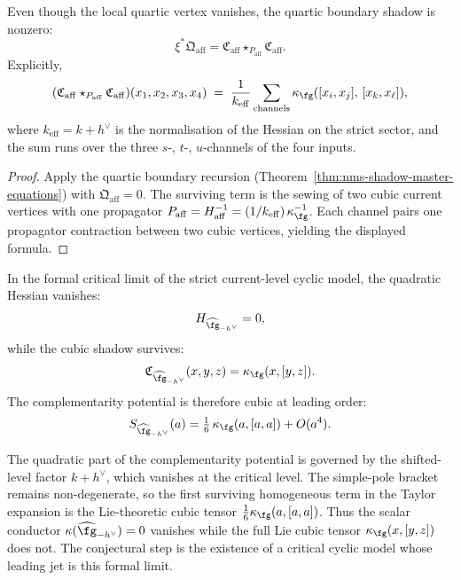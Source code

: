 \begin{corollary}\label{cor:affine-boundary-quartic}
Even though the local quartic vertex vanishes, the quartic
boundary shadow is nonzero:
\[
\xi^*\mathfrak{Q}_{\mathrm{aff}}
= \mathfrak{C}_{\mathrm{aff}} \star_{P_{\mathrm{aff}}}
 \mathfrak{C}_{\mathrm{aff}}.
\]
Explicitly,
\[
(\mathfrak{C}_{\mathrm{aff}} \star_{P_{\mathrm{aff}}}
\mathfrak{C}_{\mathrm{aff}})(x_1,x_2,x_3,x_4)
\;=\;
\frac{1}{k_{\mathrm{eff}}}
\sum_{\mathrm{channels}}
\kappa_{\fg}([x_i,x_j],\,[x_k,x_\ell]),
\]
where $k_{\mathrm{eff}} = k + h^\vee$ is the normalisation of
the Hessian on the strict sector, and the sum runs over the
three $s$-, $t$-, $u$-channels of the four inputs.
\end{corollary}

\begin{proof}
Apply the quartic boundary recursion
(Theorem~\ref{thm:nms-shadow-master-equations}) with
$\mathfrak{Q}_{\mathrm{aff}} = 0$. The surviving term is the
sewing of two cubic current vertices with one propagator
$P_{\mathrm{aff}} = H_{\mathrm{aff}}^{-1}
= (1/k_{\mathrm{eff}})\,\kappa_{\fg}^{-1}$. Each channel pairs one
propagator contraction between two cubic vertices, yielding the
displayed formula.
\end{proof}

\begin{conjecture}\label{conj:affine-critical-level-emergence}
In the formal critical limit of the strict current-level cyclic
model, the quadratic Hessian vanishes:
\[
H_{\widehat{\fg}_{-h^\vee}} = 0,
\]
while the cubic shadow survives:
\[
\mathfrak{C}_{\widehat{\fg}_{-h^\vee}}(x,y,z) = \kappa_{\fg}(x,[y,z]).
\]
The complementarity potential is therefore cubic at leading order:
\[
S_{\widehat{\fg}_{-h^\vee}}(a)
= \tfrac{1}{6}\,\kappa_{\fg}(a,[a,a]) + O(a^4).
\]
\end{conjecture}

\begin{remark}
\label{rem:critical-scalar-versus-cubic-tensor}
The quadratic part of the complementarity potential is governed
by the shifted-level factor $k + h^\vee$, which vanishes at the
critical level. The simple-pole bracket remains non-degenerate,
so the first surviving homogeneous term in the Taylor expansion
is the Lie-theoretic cubic tensor $\frac{1}{6}\kappa_{\fg}(a,[a,a])$.
Thus the scalar conductor
\(\kappa(\widehat{\fg}_{-h^\vee})=0\) vanishes while the full
Lie cubic tensor \(\kappa_{\fg}(x,[y,z])\) does not.  The
conjectural step is the existence of a critical cyclic model whose
leading jet is this formal limit.
\end{remark}

